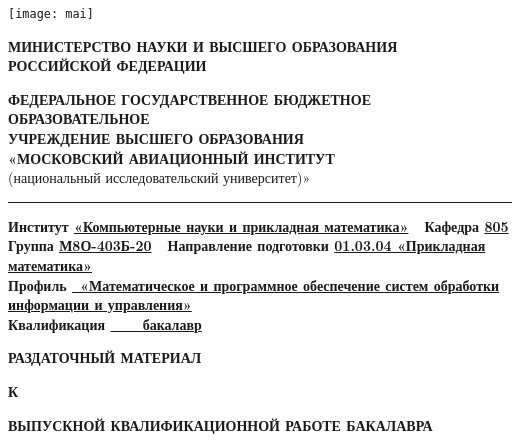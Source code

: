 \thispagestyle{empty}
\noindent
\begin{minipage}{0.2\textwidth}
    \texttt{[image: mai]}
\end{minipage}
\hfill
\begin{minipage}{0.8\textwidth}
    \centering
    \footnotesize
    \textbf{\footnotesize
    МИНИСТЕРСТВО НАУКИ И ВЫСШЕГО ОБРАЗОВАНИЯ\\
    РОССИЙСКОЙ ФЕДЕРАЦИИ}

    \vspace{1em}
    \textbf{\footnotesize
    ФЕДЕРАЛЬНОЕ ГОСУДАРСТВЕННОЕ БЮДЖЕТНОЕ ОБРАЗОВАТЕЛЬНОЕ\\ 
    УЧРЕЖДЕНИЕ ВЫСШЕГО ОБРАЗОВАНИЯ\\ 
    «МОСКОВСКИЙ АВИАЦИОННЫЙ ИНСТИТУТ}\\ 
    (национальный исследовательский университет)»
\end{minipage}

\noindent\rule{\textwidth}{1.5pt}

{
    \small
    \noindent\textbf{Институт \urule\uline{«Компьютерные науки и прикладная математика»}\urule\ \ Кафедра \urule\uline{805}\urule}\\
    \noindent\textbf{Группа \urule\uline{М8О-403Б-20}\urule\ \ Направление подготовки \urule\uline{01.03.04 «Прикладная математика»}\urule}\\ 
    \noindent\textbf{Профиль \uline{\ «Математическое и программное обеспечение систем обработки информации и управления»}\urule}\\ 
    \noindent\textbf{Квалификация \uline{\ \ \ \ бакалавр}\urule}
}

\vspace{-0.8em}
\begin{center}
    \noindent\textbf{РАЗДАТОЧНЫЙ МАТЕРИАЛ}

    \vspace{-0.8em}
    \noindent\textbf{К}

    \vspace{-0.8em}
    \noindent\textbf{ВЫПУСКНОЙ КВАЛИФИКАЦИОННОЙ РАБОТЕ БАКАЛАВРА}
\end{center}

